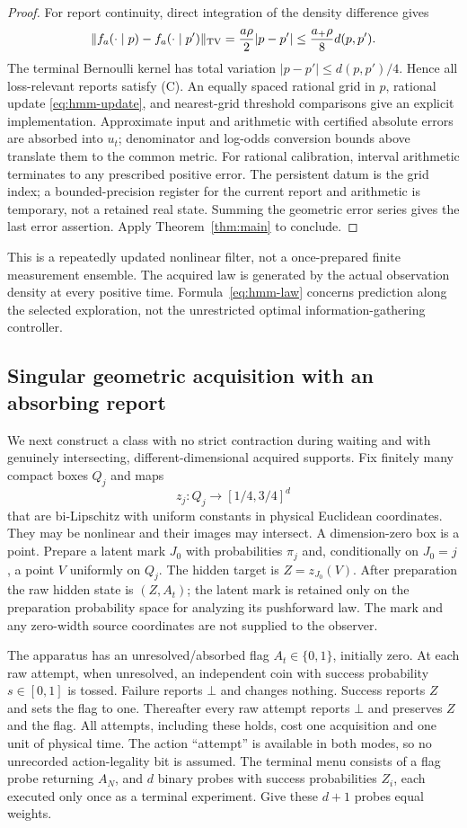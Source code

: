 \begin{proof}
For report continuity, direct integration of the density difference gives
\[
 \lVert f_a(\cdot\mid p)-f_a(\cdot\mid p')\rVert_{\mathrm{TV}}
 =\frac{a\rho}{2}|p-p'|\le\frac{a_+\rho}{8}d(p,p').
\]
The terminal Bernoulli kernel has total variation $|p-p'|\le d(p,p')/4$. Hence all loss-relevant reports satisfy \textup{(C)}. An equally spaced rational grid in $p$, rational update \eqref{eq:hmm-update}, and nearest-grid threshold comparisons give an explicit implementation. Approximate input and arithmetic with certified absolute errors are absorbed into $u_t$; denominator and log-odds conversion bounds above translate them to the common metric. For rational calibration, interval arithmetic terminates to any prescribed positive error. The persistent datum is the grid index; a bounded-precision register for the current report and arithmetic is temporary, not a retained real state. Summing the geometric error series gives the last error assertion. Apply Theorem~\ref{thm:main} to conclude.
\end{proof}

This is a repeatedly updated nonlinear filter, not a once-prepared finite measurement ensemble. The acquired law is generated by the actual observation density at every positive time. Formula~\eqref{eq:hmm-law} concerns prediction along the selected exploration, not the unrestricted optimal information-gathering controller.

\subsection{Singular geometric acquisition with an absorbing report}\label{sec:sensor}
We next construct a class with no strict contraction during waiting and with genuinely intersecting, different-dimensional acquired supports. Fix finitely many compact boxes $Q_j$ and maps
\[
 z_j:Q_j\longrightarrow[1/4,3/4]^d
\]
that are bi-Lipschitz with uniform constants in physical Euclidean coordinates. They may be nonlinear and their images may intersect. A dimension-zero box is a point. Prepare a latent mark $J_0$ with probabilities $\pi_j$ and, conditionally on $J_0=j$, a point $V$ uniformly on $Q_j$. The hidden target is $Z=z_{J_0}(V)$. After preparation the raw hidden state is $(Z,A_t)$; the latent mark is retained only on the preparation probability space for analyzing its pushforward law. The mark and any zero-width source coordinates are not supplied to the observer.

The apparatus has an unresolved/absorbed flag $A_t\in\{0,1\}$, initially zero. At each raw attempt, when unresolved, an independent coin with success probability $s\in[0,1]$ is tossed. Failure reports $\bot$ and changes nothing. Success reports $Z$ and sets the flag to one. Thereafter every raw attempt reports $\bot$ and preserves $Z$ and the flag. All attempts, including these holds, cost one acquisition and one unit of physical time. The action ``attempt'' is available in both modes, so no unrecorded action-legality bit is assumed. The terminal menu consists of a flag probe returning $A_N$, and $d$ binary probes with success probabilities $Z_i$, each executed only once as a terminal experiment. Give these $d+1$ probes equal weights.

